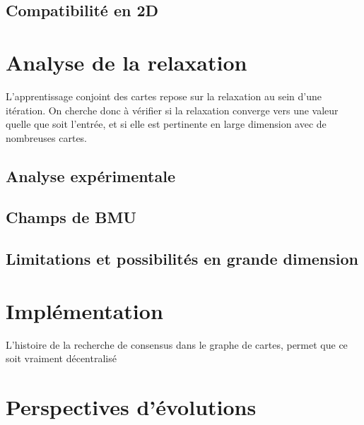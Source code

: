 \subsection{Compatibilité en 2D}

\section{Analyse de la relaxation}

L'apprentissage conjoint des cartes repose sur la relaxation au sein d'une itération. On cherche donc à vérifier si la relaxation converge vers une valeur quelle que soit l'entrée, et si elle est pertinente en large dimension avec de nombreuses cartes.

\subsection{Analyse expérimentale}

\subsection{Champs de BMU}

\subsection{Limitations et possibilités en grande dimension}

\section{Implémentation}
L'histoire de la recherche de consensus dans le graphe de cartes, permet que ce soit vraiment décentralisé

\section{Perspectives d'évolutions}